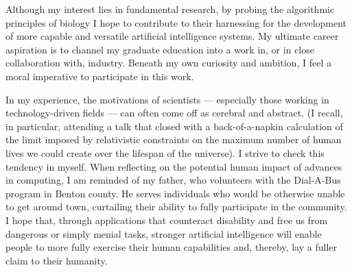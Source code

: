 Although my interest lies in fundamental research, by probing the algorithmic principles of biology I hope to contribute to their harnessing for the development of more capable and versatile artificial intelligence systems.
My ultimate career aspiration is to channel my graduate education into a work in, or in close collaboration with, industry.
Beneath my own curiosity and ambition, I feel a moral imperative to participate in this work.

In my experience, the motivations of scientists --- especially those working in technology-driven fields --- can often come off as cerebral and abstract.
(I recall, in particular, attending a talk that closed with a back-of-a-napkin calculation of the limit imposed by relativistic constraints on the maximum number of human lives we could create over the lifespan of the universe).
I strive to check this tendency in myself.
When reflecting on the potential human impact of advances in computing, I am reminded of my father, who volunteers with the Dial-A-Bus program in Benton county.
He serves individuals who would be otherwise unable to get around town, curtailing their ability to fully participate in the community.
I hope that, through applications that counteract disability and free us from dangerous or simply menial tasks, stronger artificial intelligence will enable people to more fully exercise their human capabilities and, thereby, lay a fuller claim to their humanity.
